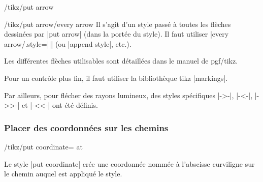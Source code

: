 \documentclass[a4paper]{ltxdoc}
\begin{document}
\begin{key}{/tikz/put arrow}
\begin{stylekey}{/tikz/put arrow/every arrow}
  Il s'agit d'un style passé à toutes les flèches dessinées par |put arrow| (dans la portée du style). Il faut utiliser |every arrow/.style={||}| (ou |append style|, etc.).
\end{stylekey}

\begin{codeexample}[width=3cm]
\end{codeexample}



Les différentes flèches utilisables sont détaillées dans le manuel de pgf/tikz.

Pour un contrôle plus fin, il faut utiliser la bibliothèque tikz |markings|. 

Par ailleurs, pour flécher des rayons lumineux, des styles spécifiques |->-|, |-<-|, |->>-| et |-<<-| ont été définis.

\end{key}

\subsubsection{Placer des coordonnées sur les chemins}

\begin{key}{/tikz/put coordinate= at }

Le style |put coordinate| crée une coordonnée nommée 
à l'abscisse curviligne  sur le chemin auquel est appliqué le style.

\begin{codeexample}[width=6cm]
\end{codeexample}

\end{key}
\end{document}
